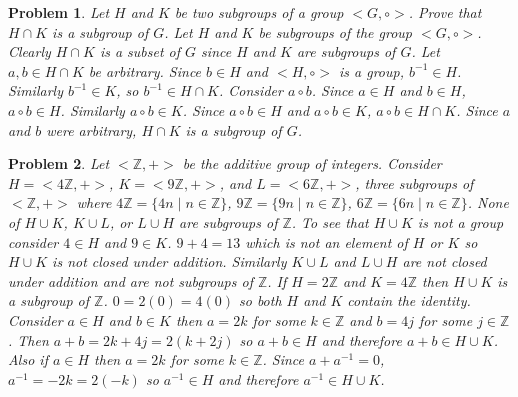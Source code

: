 \documentclass{article}
\newtheorem{Problem}{Problem}
\begin{document}
\begin{Problem}
Let $H$ and $K$ be two subgroups of a group $<G,\circ>$.  Prove that $H\cap K$ is a subgroup of $G$.  Let $H$ and $K$ be subgroups of the group $<G,\circ>$.  Clearly $H\cap K$ is a subset of $G$ since $H$ and $K$ are subgroups of $G$.  Let $a,b\in H\cap K$ be arbitrary.  Since $b\in H$ and $<H,\circ>$ is a group, $b^{-1}\in H$.  Similarly $b^{-1}\in K$, so $b^{-1}\in H\cap K$.  Consider $a\circ b$.  Since $a\in H$ and $b\in H$, $a\circ b\in H$.  Similarly $a\circ b\in K$.  Since $a\circ b\in H$ and $a\circ b\in K$, $a\circ b\in H\cap K$.  Since $a$ and $b$ were arbitrary, $H\cap K$ is a subgroup of $G$.
\end{Problem}
\begin{Problem}
Let $<\mathbb{Z},+>$ be the additive group of integers.  Consider $H=<4\mathbb{Z},+>$, $K=<9\mathbb{Z},+>$, and $L=<6\mathbb{Z},+>$, three subgroups of $<\mathbb{Z},+>$ where $4\mathbb{Z}=\{4n\mid n\in\mathbb{Z}\}$, $9\mathbb{Z}=\{9n\mid n\in\mathbb{Z}\}$, $6\mathbb{Z}=\{6n\mid n\in\mathbb{Z}\}$.  None of $H\cup K$, $K\cup L$, or $L\cup H$ are subgroups of $\mathbb{Z}$.  To see that $H\cup K$ is not a group consider $4\in H$ and $9\in K$.  $9+4=13$ which is not an element of $H$ or $K$ so $H\cup K$ is not closed under addition.  Similarly $K\cup L$ and $L\cup H$ are not closed under addition and are not subgroups of $\mathbb{Z}$.  If $H=2\mathbb{Z}$ and $K=4\mathbb{Z}$ then $H\cup K$ is a subgroup of $\mathbb{Z}$.  $0=2(0)=4(0)$ so both $H$ and $K$ contain the identity.  Consider $a\in H$ and $b\in K$ then $a=2k$ for some $k\in \mathbb{Z}$ and $b=4j$ for some $j\in\mathbb{Z}$.  Then $a+b=2k+4j=2(k+2j)$ so $a+b\in H$ and therefore $a+b\in H\cup K$.  Also if $a\in H$ then $a=2k$ for some $k\in\mathbb{Z}$.  Since $a+a^{-1}=0$, $a^{-1}=-2k=2(-k)$ so $a^{-1}\in H$ and therefore $a^{-1}\in H\cup K$.  
\end{Problem}
\end{document}
